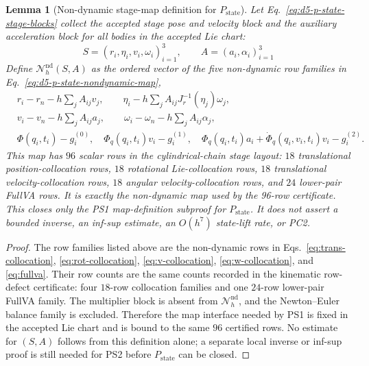 \documentclass[preprint,12pt]{elsarticle}
\newtheorem{lemma}{Lemma}
\begin{document}
\begin{lemma}[Non-dynamic stage-map definition for \(P_{\mathrm{state}}\)]
\label{lem:d5-p-state-map-definition}
Let Eq.~\eqref{eq:d5-p-state-stage-blocks} collect the accepted stage pose and
velocity block and the auxiliary acceleration block for all bodies in the
accepted Lie chart:
\begin{equation}
\label{eq:d5-p-state-stage-blocks}
  S=(r_i,\eta_i,v_i,\omega_i)_{i=1}^3,\qquad
  A=(a_i,\alpha_i)_{i=1}^3
\end{equation}
Define \(\mathcal N_h^{\mathrm{nd}}(S,A)\) as the ordered vector of the five
non-dynamic row families in Eq.~\eqref{eq:d5-p-state-nondynamic-map},
\begin{equation}
\label{eq:d5-p-state-nondynamic-map}
\begin{aligned}
&r_i-r_n-h\sum_j A_{ij}v_j,\qquad
  \eta_i-h\sum_j A_{ij}J_r^{-1}(\eta_j)\omega_j,\\
&v_i-v_n-h\sum_j A_{ij}a_j,\qquad
  \omega_i-\omega_n-h\sum_j A_{ij}\alpha_j,\\
&\Phi(q_i,t_i)-g_i^{(0)},\quad
  \Phi_q(q_i,t_i)v_i-g_i^{(1)},\quad
  \Phi_q(q_i,t_i)a_i+\dot\Phi_q(q_i,v_i,t_i)v_i-g_i^{(2)} .
\end{aligned}
\end{equation}
This map has \(96\) scalar rows in the cylindrical-chain stage layout: \(18\)
translational position-collocation rows, \(18\) rotational Lie-collocation
rows, \(18\) translational velocity-collocation rows, \(18\) angular
velocity-collocation rows, and \(24\) lower-pair FullVA rows.  It is exactly
the non-dynamic map used by the 96-row certificate. This closes only the PS1
map-definition subproof for \(P_{\mathrm{state}}\). It does not assert a
bounded inverse, an inf-sup estimate, an \(O(h^7)\) state-lift rate, or PC2.
\end{lemma}

\begin{proof}
The row families listed above are the non-dynamic rows in
Eqs.~\eqref{eq:trans-collocation}, \eqref{eq:rot-collocation},
\eqref{eq:v-collocation}, \eqref{eq:w-collocation}, and
\eqref{eq:fullva}.  Their row counts are the same counts recorded in the
kinematic row-defect certificate: four \(18\)-row collocation families and one
\(24\)-row lower-pair FullVA family. The multiplier block is absent from
\(\mathcal N_h^{\mathrm{nd}}\), and the Newton--Euler balance family is
excluded. Therefore the map interface needed by PS1 is fixed in the accepted
Lie chart and is bound to the same \(96\) certified rows. No estimate for
\((S,A)\) follows from this definition alone; a separate local inverse or
inf-sup proof is still needed for PS2 before \(P_{\mathrm{state}}\) can be
closed.
\end{proof}
\end{document}
